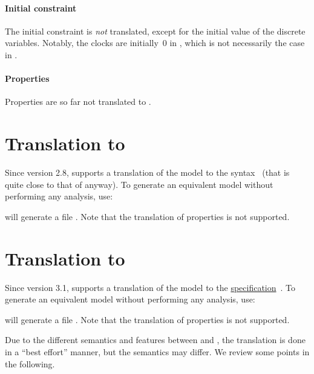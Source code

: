 \paragraph{Initial constraint}
The initial constraint is \emph{not} translated, except for the initial value of the discrete variables.
Notably, the clocks are initially~0 in \uppaal{}, which is not necessarily the case in \imitator{}.

\paragraph{Properties}
Properties are so far not translated to \uppaal{}.



\section{Translation to \hytech{}}\label{section:hytech}

Since version 2.8, \imitator{} supports a translation of the model to the \hytech{} syntax~\cite{HHW95} (that is quite close to that of \imitator{} anyway).
To generate an equivalent \hytech{} model without performing any analysis, use:


\imitator{} will generate a file .
Note that the translation of properties is not supported.

\section{Translation to \jani{}}\label{section:jani}

Since version 3.1, \imitator{} supports a translation of the model to the \href{https://jani-spec.org/}{\jani{} specification}~\cite{BDHHJT17}.
To generate an equivalent \jani{} model without performing any analysis, use:


\imitator{} will generate a file .
Note that the translation of properties is not supported.

Due to the different semantics and features between \imitator{} and \jani{}, the translation is done in a ``best effort'' manner, but the semantics may differ.
We review some points in the following.

